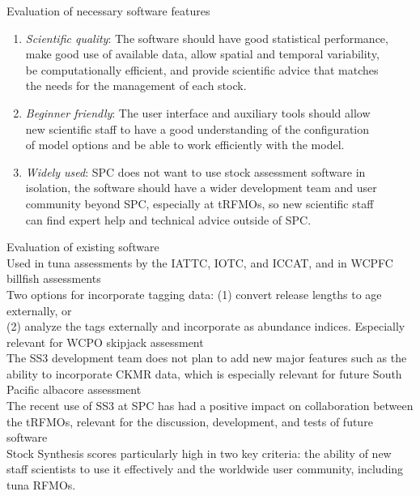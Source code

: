 \documentclass[aspectratio=169,fleqn]{beamer}
\begin{document}
\begin{frame}{Evaluation of necessary software features}\small
  \\[1ex]
  \begin{enumerate}
    \item \textit{Scientific quality}:
    The software should have good statistical performance,\\
    make good use of available data, allow spatial and temporal variability,\\
    be computationally efficient, and provide scientific advice that matches\\
    the needs for the management of each stock.\\[2.5ex]
    \item \textit{Beginner friendly}:
    The user interface and auxiliary tools should allow\\
    new scientific staff to have a good understanding of the configuration\\
    of model options and be able to work efficiently with the model.\\[2.5ex]
    \item \textit{Widely used}:
    SPC does not want to use stock assessment software in\\
    isolation, the software should have a wider development team and user\\
    community beyond SPC, especially at tRFMOs, so new scientific staff\\
    can find expert help and technical advice outside of SPC.\\[2.5ex]
  \end{enumerate}
\end{frame}


\begin{frame}{Evaluation of existing software}\small
  \\[2ex]
  Used in tuna assessments by the IATTC, IOTC, and ICCAT, and in WCPFC billfish
  assessments\\[2.5ex]
  Two options for incorporate tagging data: (1) convert release lengths to age
  externally, or\\
  (2) analyze the tags externally and incorporate as abundance indices.
  Especially relevant for WCPO skipjack assessment\\[2.5ex]
  The SS3 development team does not plan to add new major features such as the
  ability to incorporate CKMR data, which is especially relevant for future
  South Pacific albacore assessment\\[2.5ex]
  The recent use of SS3 at SPC has had a positive impact on collaboration
  between the tRFMOs, relevant for the discussion, development, and
  tests of future software\\[2.5ex]
  Stock Synthesis scores particularly high in two key criteria: the ability of
  new staff scientists to use it effectively and the worldwide user community,
  including tuna RFMOs.\\[2ex]
\end{frame}
\end{document}
